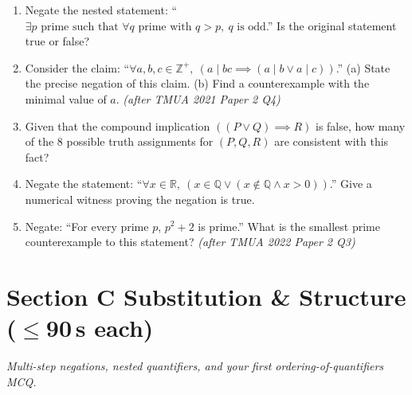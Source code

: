 \documentclass[11pt,a4paper]{article}
\begin{document}
\begin{enumerate}
\item Negate the nested statement: ``$\exists p \text{ prime such that } \forall q \text{ prime with } q > p,\ q \text{ is odd}$.'' Is the original statement true or false?

\item Consider the claim: ``$\forall a, b, c \in \mathbb{Z}^+,\ (a \mid bc \implies (a \mid b \lor a \mid c))$.'' (a) State the precise negation of this claim. (b) Find a counterexample with the minimal value of $a$. \textit{\small(after TMUA 2021 Paper 2 Q4)}

\item Given that the compound implication $((P \lor Q) \implies R)$ is false, how many of the $8$ possible truth assignments for $(P, Q, R)$ are consistent with this fact?

\item Negate the statement: ``$\forall x \in \mathbb{R},\ (x \in \mathbb{Q} \lor (x \notin \mathbb{Q} \land x > 0))$.'' Give a numerical witness proving the negation is true.

\item Negate: ``For every prime $p$, $p^2 + 2$ is prime.'' What is the smallest prime counterexample to this statement? \textit{\small(after TMUA 2022 Paper 2 Q3)}

\end{enumerate}

\section*{Section C \quad Substitution \& Structure \hfill{\normalfont\small($\leq$90\,s each)}}

\noindent\textit{Multi-step negations, nested quantifiers, and your first ordering-of-quantifiers MCQ.}
\end{document}
